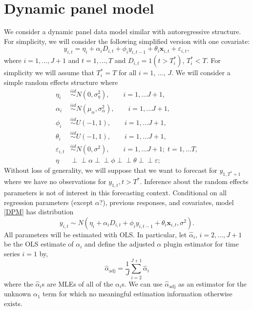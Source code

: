 \documentclass[11pt]{article}
\newcommand{\x}{\textbf{x}}
\newcommand{\indep}{\perp\!\!\!\perp}
\begin{document}
\section{Dynamic panel model}
\label{sec:dpm}
We consider a dynamic panel data model similar with autoregressive structure.  
For simplicity, we will consider the following simplified version with one covariate:
\begin{equation} \label{DPM}
  y_{i,t} = \eta_i + \alpha_iD_{i,t} + \phi_i y_{i,t-1} + \theta_i \x_{i,t} 
    + \varepsilon_{i,t}, 
\end{equation}
where $i = 1,\ldots,J+1$ and $t = 1,\ldots,T$ and $D_{i,t} = 1(t > T_i^*)$, 
$T_i^* < T$.  For simplicity we will assume that $T_i^* = T$ for all $i = 1$,
$\ldots$, $J$.  We will consider a simple random effects structure where 
\begin{align*}
  \eta_i &\overset{iid}{\sim} N(0, \sigma_\eta^2), 
    \qquad i = 1,\ldots J+1, \\
  \alpha_i &\overset{iid}{\sim} N(\mu_\alpha, \sigma_\alpha^2), 
    \qquad i = 1,\ldots J+1, \\
  \phi_i &\overset{iid}{\sim} U(-1,1), 
    \qquad i = 1,\ldots J+1, \\
  \theta_i &\overset{iid}{\sim} U(-1,1), 
    \qquad i = 1,\ldots J+1, \\
  \varepsilon_{i,t} &\overset{iid}{\sim} N(0, \sigma^2), 
    \qquad i = 1,\ldots J+1;\; t = 1, \ldots T, \\
  \eta &\indep \alpha \indep \phi \indep \theta \indep \varepsilon;
\end{align*}
Without loss of generality, we will suppose that we want to forecast for 
$y_{1, T^* + 1}$ where we have no observations for $y_{1,t}, t > T^*$. 
Inference about the random effects parameters is not of interest in this  
forecasting context.  Conditional on all regression parameters 
(except $\alpha$?), previous responses, and covariates, model \eqref{DPM} 
has distribution
$$
  y_{i,t} 
    \sim N(\eta_i + \alpha_iD_{i,t} + \phi_i y_{i,t-1} + \theta_i\x_{i,t}, \sigma^2).
$$
All parameters will be estimated with OLS. In particular, let 
$\hat{\alpha}_i$, $i = 2,\ldots,J+1$ be the OLS estimate of $\alpha_i$ 
and define the adjusted $\alpha$ plugin estimator for time series $i=1$ by,
\begin{equation} \label{adjusted}
  \hat{\alpha}_{\text{adj}} = \frac{1}{J}\sum_{i=2}^{J+1}\hat{\alpha}_i
\end{equation}
where the $\hat{\alpha}_i$s are MLEs of all of the $\alpha_i$s.  
We can use $\hat{\alpha}_{\text{adj}}$ as an estimator for the unknown 
$\alpha_1$ term for which no meaningful estimation information otherwise 
exists. 
\end{document}
